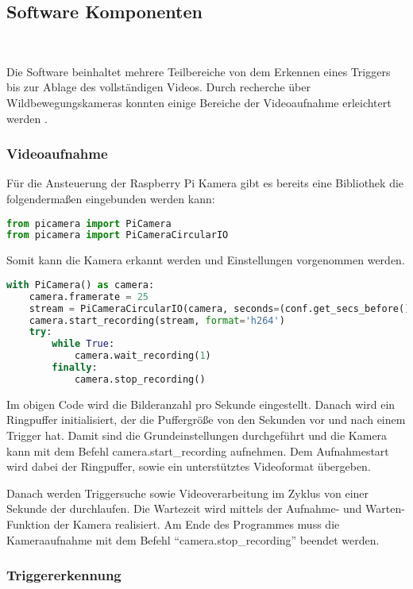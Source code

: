 \subsection{Software Komponenten} \
\label{subsec:evalsys_software}

Die Software beinhaltet mehrere Teilbereiche von dem Erkennen eines Triggers bis zur Ablage des vollständigen Videos. Durch recherche über Wildbewegungskameras konnten einige Bereiche der Videoaufnahme erleichtert werden \cite{rasp_ansteuerung}.

\subsubsection{Videoaufnahme}

Für die Ansteuerung der Raspberry Pi Kamera gibt es bereits eine Bibliothek die folgendermaßen eingebunden werden kann:

\begin{lstlisting}[language=Python]
from picamera import PiCamera
from picamera import PiCameraCircularIO
\end{lstlisting}

Somit kann die Kamera erkannt werden und Einstellungen vorgenommen werden.

\begin{lstlisting}[language=Python]
with PiCamera() as camera:
	camera.framerate = 25
	stream = PiCameraCircularIO(camera, seconds=(conf.get_secs_before() + conf.get_secs_after()))
	camera.start_recording(stream, format='h264')
	try:
		while True:
			camera.wait_recording(1)	
		finally:
			camera.stop_recording()
\end{lstlisting}

Im obigen Code wird die Bilderanzahl pro Sekunde eingestellt. Danach wird ein Ringpuffer initialisiert, der die Puffergröße von den Sekunden vor und nach einem Trigger hat. Damit sind die Grundeinstellungen durchgeführt und die Kamera kann mit dem Befehl \glqq{} camera.start\_recording \grqq{} aufnehmen. Dem Aufnahmestart wird dabei der Ringpuffer, sowie ein unterstütztes Videoformat übergeben.

Danach werden Triggersuche sowie Videoverarbeitung im Zyklus von einer Sekunde der durchlaufen. Die Wartezeit wird mittels der Aufnahme- und Warten-Funktion der Kamera realisiert. Am Ende des Programmes muss die Kameraaufnahme mit dem Befehl "`camera.stop\_recording"' beendet werden.

\subsubsection{Triggererkennung}
\label{subsubsec:triggererkennung}

